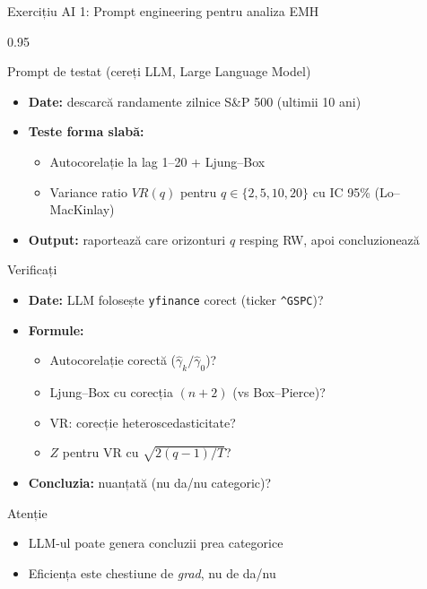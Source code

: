 \documentclass[9pt, aspectratio=169, t]{beamer}
\begin{document}
\begin{frame}[shrink=15]{Exercițiu AI 1: Prompt engineering pentru analiza EMH}
\begin{cminipage}{0.95\textwidth}
\vspace{-3mm}
\begin{block}{\footnotesize Prompt de testat (cereți LLM, Large Language Model)}
\footnotesize
\begin{itemize}\setlength{\itemsep}{0pt}
    \item \textbf{Date:} descarcă randamente zilnice S\&P 500 (ultimii 10 ani)
    \item \textbf{Teste forma slabă:}
    \begin{itemize}\setlength{\itemsep}{0pt}
        \item Autocorelație la lag 1--20 + Ljung--Box
        \item Variance ratio $VR(q)$ pentru $q \in \{2, 5, 10, 20\}$ cu IC 95\% (Lo--MacKinlay)
    \end{itemize}
    \item \textbf{Output:} raportează care orizonturi $q$ resping RW, apoi concluzionează
\end{itemize}
\end{block}
\vspace{-2mm}
\begin{block}{\footnotesize Verificați}
\footnotesize
\begin{itemize}\setlength{\itemsep}{0pt}
    \item \textbf{Date:} LLM folosește \texttt{yfinance} corect (ticker \texttt{\^{}GSPC})?
    \item \textbf{Formule:}
    \begin{itemize}\setlength{\itemsep}{0pt}
        \item Autocorelație corectă ($\hat\gamma_k / \hat\gamma_0$)?
        \item Ljung--Box cu corecția $(n+2)$ (vs Box--Pierce)?
        \item VR: corecție heteroscedasticitate?
        \item $Z$ pentru VR cu $\sqrt{2(q-1)/T}$?
    \end{itemize}
    \item \textbf{Concluzia:} nuanțată (nu da/nu categoric)?
\end{itemize}
\end{block}
\vspace{-2mm}
\begin{alertblock}{Atenție}
\footnotesize
\begin{itemize}\setlength{\itemsep}{0pt}
    \item LLM-ul poate genera concluzii prea categorice
    \item Eficiența este chestiune de \emph{grad}, nu de da/nu
\end{itemize}
\end{alertblock}
\end{cminipage}
\end{frame}
\end{document}
